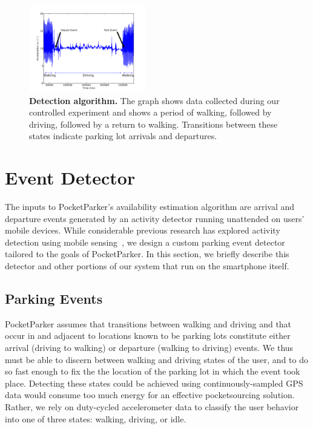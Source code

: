 \begin{figure}
  \centering
  \includegraphics[trim = 8mm 10mm 10mm 10mm,height=1.5in,width=\columnwidth]{./figures/detection-cropped.pdf}

  \caption{\textbf{Detection algorithm.} The graph shows data collected
    during our controlled experiment and shows a period of walking, followed by
    driving, followed by a return to walking. Transitions between these states
  indicate parking lot arrivals and departures.}

  \label{fig-detection}
\end{figure}
\section{Event Detector}
\label{sec-detector}
The inputs to PocketParker's availability estimation algorithm are arrival and
departure events generated by an activity detector running unattended on users'
mobile devices.  While considerable previous research has explored activity
detection using mobile sensing~\cite{Constandache:2010:DYS, Keally:2011:PTP,
Reddy:2010:UMP, Yang:2011:DDP, Wang:2009:FEE}, we design a custom parking event
detector tailored to the goals of PocketParker.  In this section, we briefly
describe this detector and other portions of our system that run on the
smartphone itself.  

\subsection{Parking Events}
\label{subsec-goals}
PocketParker assumes that transitions between walking and driving and that occur
in and adjacent to locations known to be parking lots constitute either
arrival (driving to walking) or departure (walking to driving) events.  We thus
must be able to discern between walking and driving states of the user, and to 
do so fast enough to fix the the location of the parking lot in which the
event took place.  Detecting these states could be achieved using
continuously-sampled GPS data would consume too much energy for an effective
pocketsourcing solution.  Rather, we rely on duty-cycled accelerometer data to
classify the user behavior into one of three states: walking, driving, or idle.


